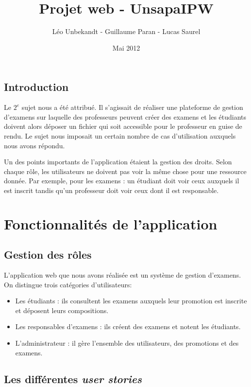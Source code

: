 \documentclass{report}
\author{Léo Unbekandt - Guillaume Paran - Lucas Saurel}
\date{Mai 2012}
\title{Projet web - UnsapaIPW}
\begin{document}
  \maketitle
  \clearpage
  \tableofcontents
  \clearpage

  \section*{Introduction}
    Le $2^e$ sujet nous a été attribué. Il s'agissait de réaliser une plateforme
    de gestion d'examens sur laquelle des professeurs peuvent créer des examens
    et les étudiants doivent alors déposer un fichier qui soit accessible pour
    le professeur en guise de rendu. Le sujet nous imposait un certain nombre de
    cas d'utilisation auxquels nous avons répondu.

    Un des points importants de l'application étaient la gestion des droits.
    Selon chaque rôle, les utilisateurs ne doivent pas voir la même chose
    pour une ressource donnée. Par exemple, pour les examens : un étudiant doit voir
    ceux auxquels il est inscrit tandis qu'un professeur doit voir ceux dont il est 
    responsable.

  \clearpage
    
  \chapter{Fonctionnalités de l'application}
    \section{Gestion des rôles}
      L'application web que nous avons réalisée est un système de gestion 
      d'examens. On distingue trois catégories d'utilisateurs:

      \begin{itemize}
        \item{Les étudiants : ils consultent les examens auxquels leur promotion 
          est inscrite et déposent leurs compositions.}
        \item{Les responsables d'examens : ils créent des examens et notent les 
          étudiants.}
        \item{L'administrateur : il gère l'ensemble des utilisateurs, des 
          promotions et des examens.}
      \end{itemize}

    \section{Les différentes \textsl{user stories}}
\end{document}
